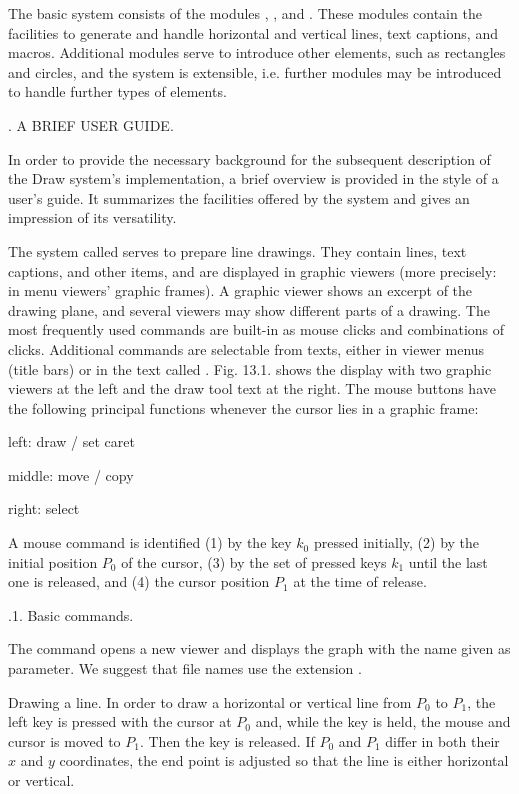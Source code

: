 The basic system consists of the modules , , and . These modules contain the facilities to generate and handle horizontal and vertical lines, text captions, and macros. Additional modules serve to introduce other elements, such as rectangles and circles, and the system is extensible, i.e. further modules may be introduced to handle further types of elements.

. A BRIEF USER GUIDE.

In order to provide the necessary background for the subsequent description of the Draw system's implementation, a brief overview is provided in the style of a user's guide. It summarizes the facilities offered by the system and gives an impression of its versatility.

The system called  serves to prepare line drawings. They contain lines, text captions, and other items, and are displayed in graphic viewers (more precisely: in menu viewers' graphic frames). A graphic viewer shows an excerpt of the drawing plane, and several viewers may show different parts of a drawing. The most frequently used commands are built-in as mouse clicks and combinations of clicks. Additional commands are selectable from texts, either in viewer menus (title bars) or in the text called . Fig. 13.1. shows the display with two graphic viewers at the left and the draw tool text at the right. The mouse buttons have the following principal functions whenever the cursor lies in a graphic frame:
{ \medskip \narrower
\item{left:} draw / set caret
\item{middle:} move / copy
\item{right:} select
\medskip }
\noindent A mouse command is identified (1) by the key $k_0$ pressed initially, (2) by the initial position $P_0$ of the cursor, (3) by the set of pressed keys $k_1$ until the last one is released, and (4) the cursor position $P_1$ at the time of release.

.1. Basic commands.

The command  opens a new viewer and displays the graph with the name given as parameter. We suggest that file names use the extension .

Drawing a line. In order to draw a horizontal or vertical line from $P_0$ to $P_1$, the left key is pressed with the cursor at $P_0$ and, while the key is held, the mouse and cursor is moved to $P_1$. Then the key is released. If $P_0$ and $P_1$ differ in both their $x$ and $y$ coordinates, the end point is adjusted so that the line is either horizontal or vertical.

